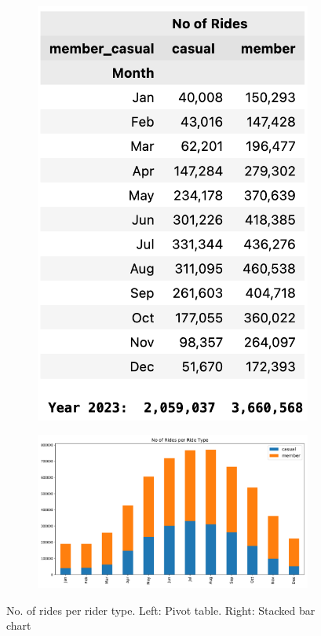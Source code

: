 \documentclass[12pt]{article}
\begin{document}
	\begin{figure}[h]
	\begin{subfigure}{.3\textwidth}
		\includegraphics[scale=0.5]{no_of_rides_per_rider.png} 
	\end{subfigure}
	\begin{subfigure}{.6\textwidth}
	\hspace{-0.35in}
		\includegraphics[scale=0.46]{no_of_rides_per_rider_type.pdf}
	\end{subfigure}
	\caption{No. of rides per rider type. Left: Pivot table. Right: Stacked bar chart}
	\label{fig17}
	\end{figure}
	
\end{document}

